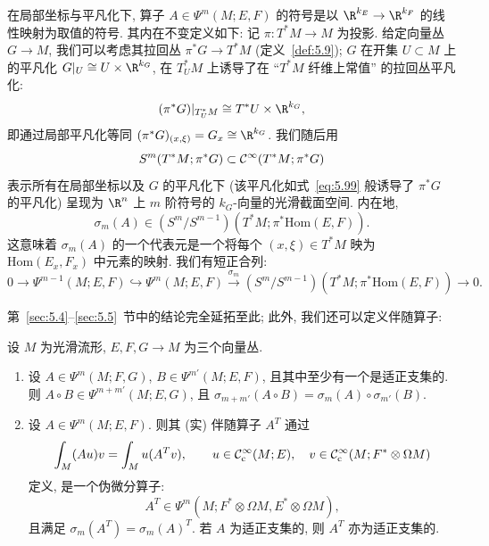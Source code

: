 在局部坐标与平凡化下, 算子 $A \in \Psi^m(M; E, F)$ 的符号是以 $\R^{k_E} \to \R^{k_F}$ 的线性映射为取值的符号. 其内在不变定义如下: 记 $\pi \colon T^* M \to M$ 为投影. 给定向量丛 $G \to M$, 我们可以考虑其拉回丛 $\pi^* G \to T^* M$ (定义~\ref{def:5.9}); $G$ 在开集 $U \subset M$ 上的平凡化 $G|_U \cong U \times \R^{k_G}$, 在 $T^*_U M$ 上诱导了在 ``$T^* M$ 纤维上常值'' 的拉回丛平凡化:
\begin{equation}\label{eq:5.99}
    (\pi^* G)|_{T^*_U M} \cong T^* U \times \R^{k_G},
\end{equation}
即通过局部平凡化等同 $(\pi^* G)_{(x, \xi)} = G_x \cong \R^{k_G}$. 我们随后用
\begin{equation}\label{eq:5.100}
    S^m(T^* M; \pi^* G) \subset \mathcal{C}^\infty(T^* M; \pi^* G)
\end{equation}
表示所有在局部坐标以及 $G$ 的平凡化下 (该平凡化如式~\eqref{eq:5.99} 般诱导了 $\pi^* G$ 的平凡化) 呈现为 $\R^n$ 上 $m$ 阶符号的 $k_G$-向量的光滑截面空间. 内在地,
\begin{equation}\label{eq:5.101}
    \sigma_m(A) \in (S^m / S^{m-1})(T^* M; \pi^* \mathrm{Hom}(E, F)).
\end{equation}
这意味着 $\sigma_m(A)$ 的一个代表元是一个将每个 $(x, \xi) \in T^* M$ 映为 $\mathrm{Hom}(E_x, F_x)$ 中元素的映射. 我们有短正合列:
\begin{equation}\label{eq:5.102}
    0 \to \Psi^{m-1}(M; E, F) \hookrightarrow \Psi^m(M; E, F) \xrightarrow{\sigma_m} (S^m / S^{m-1})(T^* M; \pi^* \mathrm{Hom}(E, F)) \to 0.
\end{equation}

第~\ref{sec:5.4}--\ref{sec:5.5}~节中的结论完全延拓至此; 此外, 我们还可以定义伴随算子:

\begin{proposition}[复合与伴随]\label{prop:5.43}
设 $M$ 为光滑流形, $E, F, G \to M$ 为三个向量丛.
\begin{enumerate}
    \item 设 $A \in \Psi^m(M; F, G)$, $B \in \Psi^{m'}(M; E, F)$, 且其中至少有一个是适正支集的. 则 $A \circ B \in \Psi^{m+m'}(M; E, G)$, 且 $\sigma_{m+m'}(A \circ B) = \sigma_m(A) \circ \sigma_{m'}(B)$.
    \item 设 $A \in \Psi^m(M; E, F)$. 则其 (实) 伴随算子 $A^T$ 通过
    \begin{equation}\label{eq:5.103}
        \int_M (A u) v = \int_M u (A^T v), \qquad u \in \mathcal{C}_{\mathrm{c}}^\infty(M; E), \quad v \in \mathcal{C}_{\mathrm{c}}^\infty(M; F^* \otimes \Omega M)
    \end{equation}
    定义, 是一个伪微分算子:
    \begin{equation}\label{eq:5.104}
        A^T \in \Psi^m(M; F^* \otimes \Omega M, E^* \otimes \Omega M),
    \end{equation}
    且满足 $\sigma_m(A^T) = \sigma_m(A)^T$. 若 $A$ 为适正支集的, 则 $A^T$ 亦为适正支集的.
\end{enumerate}
\end{proposition}


